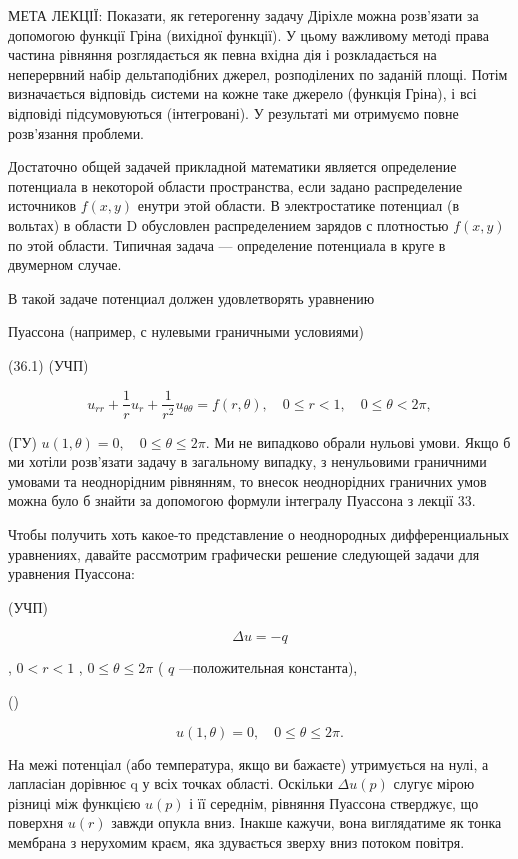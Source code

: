 \documentclass[
  ukrainian,
]{article}
\begin{document}
МЕТА ЛЕКЦІЇ: Показати, як гетерогенну задачу Діріхле можна розв'язати за
допомогою функції Гріна (вихідної функції). У цьому важливому методі
права частина рівняння розглядається як певна вхідна дія і розкладається
на неперервний набір дельтаподібних джерел, розподілених по заданій
площі. Потім визначається відповідь системи на кожне таке джерело
(функція Гріна), і всі відповіді підсумовуються (інтегровані). У
результаті ми отримуємо повне розв'язання проблеми.

Достаточно общей задачей прикладной математики является определение
потенциала в некоторой области пространства, если задано распределение
источников \(f(x, y)\) енутри этой области. В электростатике потенциал
(в вольтах) в области D обусловлен распределением зарядов с плотностью
\(f(x, y)\) по этой области. Типичная задача --- определение потенциала
в круге в двумерном случае.

В такой задаче потенциал должен удовлетворять уравнению

Пуассона (например, с нулевыми граничными условиями)

(36.1) (УЧП)

\[
u_{rr} + \frac{1}{r} u_r + \frac{1}{r^2} u_{\theta\theta} = f(r, \theta), \quad 0 \le r < 1, \quad 0 \le \theta < 2\pi,
\]

(ГУ) \(u(1, \theta) = 0, \quad 0 \le \theta \le 2\pi.\) Ми не випадково
обрали нульові умови. Якщо б ми хотіли розв'язати задачу в загальному
випадку, з ненульовими граничними умовами та неоднорідним рівнянням, то
внесок неоднорідних граничних умов можна було б знайти за допомогою
формули інтегралу Пуассона з лекції 33.

Чтобы получить хоть какое-то представление о неоднородных
дифференциальных уравнениях, давайте рассмотрим графически решение
следующей задачи для уравнения Пуассона:

(УЧП)

\[
\Delta u = -q
\]

, \(0 < r < 1\) , \(0 \le \theta \le 2\pi\) ( \(q\) ---положительная
константа),

()

\[
u(1, \theta) = 0, \quad 0 \le \theta \le 2\pi.
\]

На межі потенціал (або температура, якщо ви бажаєте) утримується на
нулі, а лапласіан дорівнює q у всіх точках області. Оскільки
\(\Delta u\left(p\right)\) слугує мірою різниці між функцією
\(u\left(p\right)\) і її середнім, рівняння Пуассона стверджує, що
поверхня \(u\left(r\right)\) завжди опукла вниз. Інакше кажучи, вона
виглядатиме як тонка мембрана з нерухомим краєм, яка здувається зверху
вниз потоком повітря.
\end{document}
